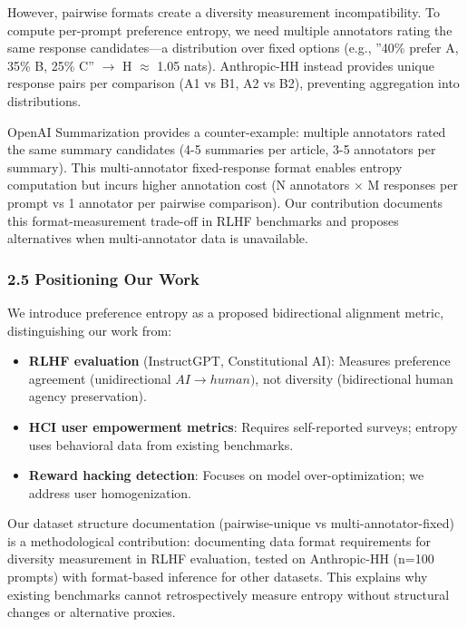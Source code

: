 However, pairwise formats create a diversity measurement incompatibility. To compute per-prompt preference entropy, we need multiple annotators rating the same response candidates---a distribution over fixed options (e.g., ''40\% prefer A, 35\% B, 25\% C'' $\rightarrow$ H $\approx$ 1.05 nats). Anthropic-HH instead provides unique response pairs per comparison (A1 vs B1, A2 vs B2), preventing aggregation into distributions.

OpenAI Summarization \citep{stiennon2020summarize} provides a counter-example: multiple annotators rated the same summary candidates (4-5 summaries per article, 3-5 annotators per summary). This multi-annotator fixed-response format enables entropy computation but incurs higher annotation cost (N annotators $\times$ M responses per prompt vs 1 annotator per pairwise comparison). Our contribution documents this format-measurement trade-off in RLHF benchmarks and proposes alternatives when multi-annotator data is unavailable.

\subsubsection{2.5 Positioning Our Work}

We introduce preference entropy as a proposed bidirectional alignment metric, distinguishing our work from:

\begin{itemize}
\item \textbf{RLHF evaluation} (InstructGPT, Constitutional AI): Measures preference agreement (unidirectional $AI\rightarrow human)$, not diversity (bidirectional human agency preservation).
\item \textbf{HCI user empowerment metrics}: Requires self-reported surveys; entropy uses behavioral data from existing benchmarks.
\item \textbf{Reward hacking detection}: Focuses on model over-optimization; we address user homogenization.
\end{itemize}

Our dataset structure documentation (pairwise-unique vs multi-annotator-fixed) is a methodological contribution: documenting data format requirements for diversity measurement in RLHF evaluation, tested on Anthropic-HH (n=100 prompts) with format-based inference for other datasets. This explains why existing benchmarks cannot retrospectively measure entropy without structural changes or alternative proxies.

